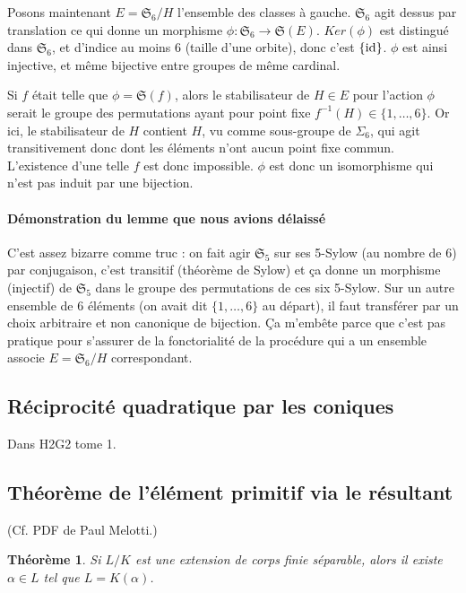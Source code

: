 \documentclass[a4paper, 11pt]{article}
\def\Sigmap{\mathfrak{S}}
\newtheorem*{theorem}{Théorème}
\begin{document}
Posons maintenant $E = \Sigmap_6/H$ l'ensemble des classes à gauche. $\Sigmap_6$
agit dessus par translation ce qui donne un morphisme $\phi : \Sigmap_6 \to
\Sigmap(E)$. $Ker(\phi)$ est distingué dans $\Sigmap_6$, et d'indice au moins 6
(taille d'une orbite), donc c'est $\{\textnormal{id}\}$. $\phi$ est ainsi
injective, et même bijective entre groupes de même cardinal.

Si $f$ était telle que $\phi = \Sigmap(f)$, alors le stabilisateur de $H \in E$
pour l'action $\phi$ serait le groupe des permutations ayant pour point fixe
$f^{-1}(H) \in \{1,\ldots,6\}$. Or ici, le stabilisateur de $H$ contient $H$, vu
comme sous-groupe de $\Sigma_6$, qui agit transitivement donc dont les éléments
n'ont aucun point fixe commun. L'existence d'une telle $f$ est donc impossible.
$\phi$ est donc un isomorphisme qui n'est pas induit par une bijection.

\paragraph{Démonstration du lemme que nous avions délaissé} C'est assez bizarre
comme truc : on fait agir $\Sigmap_5$ sur ses 5-Sylow (au nombre de 6) par
conjugaison, c'est transitif (théorème de Sylow) et ça donne un morphisme
(injectif) de $\Sigmap_5$ dans le groupe des permutations de ces six 5-Sylow.
Sur un autre ensemble de 6 éléments (on avait dit $\{1,\ldots,6\}$ au départ),
il faut transférer par un choix arbitraire et non canonique de bijection. Ça
m'embête parce que c'est pas pratique pour s'assurer de la fonctorialité de la
procédure qui a un ensemble associe $E = \Sigmap_6/H$ correspondant.


\subsection{Réciprocité quadratique par les coniques}

Dans H2G2 tome 1.

\subsection{Théorème de l'élément primitif via le résultant}

(Cf. PDF de Paul Melotti.)

\begin{theorem}
  Si $L/K$ est une extension de corps finie séparable, alors il existe $\alpha
  \in L$ tel que $L = K(\alpha)$.
\end{theorem}
\end{document}
